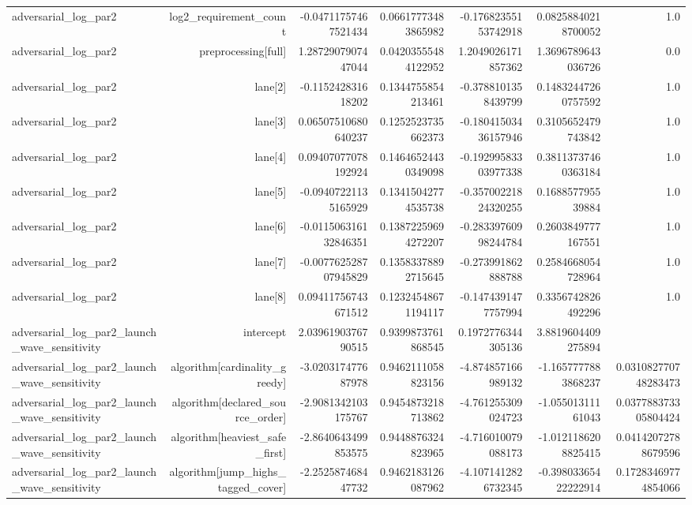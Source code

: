 {\begin{longtable}{lrrrrrr}
adversarial\_log\_par2 & log2\_requirement\_count & -0.04711757467521434 & 0.06617773483865982 & -0.17682355153742918 & 0.08258840218700052 & 1.0 \\
adversarial\_log\_par2 & preprocessing[full] & 1.2872907907447044 & 0.04203555484122952 & 1.2049026171857362 & 1.3696789643036726 & 0.0 \\
adversarial\_log\_par2 & lane[2] & -0.115242831618202 & 0.1344755854213461 & -0.3788101358439799 & 0.14832447260757592 & 1.0 \\
adversarial\_log\_par2 & lane[3] & 0.06507510680640237 & 0.1252523735662373 & -0.18041503436157946 & 0.3105652479743842 & 1.0 \\
adversarial\_log\_par2 & lane[4] & 0.09407077078192924 & 0.14646524430349098 & -0.19299583303977338 & 0.38113737460363184 & 1.0 \\
adversarial\_log\_par2 & lane[5] & -0.09407221135165929 & 0.13415042774535738 & -0.35700221824320255 & 0.168857795539884 & 1.0 \\
adversarial\_log\_par2 & lane[6] & -0.011506316132846351 & 0.13872259694272207 & -0.28339760998244784 & 0.2603849777167551 & 1.0 \\
adversarial\_log\_par2 & lane[7] & -0.007762528707945829 & 0.13583378892715645 & -0.273991862888788 & 0.2584668054728964 & 1.0 \\
adversarial\_log\_par2 & lane[8] & 0.09411756743671512 & 0.12324548671194117 & -0.1474391477757994 & 0.3356742826492296 & 1.0 \\
adversarial\_log\_par2\_launch\_wave\_sensitivity & intercept & 2.0396190376790515 & 0.9399873761868545 & 0.1972776344305136 & 3.8819604409275894 &  \\
adversarial\_log\_par2\_launch\_wave\_sensitivity & algorithm[cardinality\_greedy] & -3.020317477687978 & 0.9462111058823156 & -4.874857166989132 & -1.1657777883868237 & 0.031082770748283473 \\
adversarial\_log\_par2\_launch\_wave\_sensitivity & algorithm[declared\_source\_order] & -2.9081342103175767 & 0.9454873218713862 & -4.761255309024723 & -1.05501311161043 & 0.037788373305804424 \\
adversarial\_log\_par2\_launch\_wave\_sensitivity & algorithm[heaviest\_safe\_first] & -2.8640643499853575 & 0.9448876324823965 & -4.716010079088173 & -1.0121186208825415 & 0.04142072788679596 \\
adversarial\_log\_par2\_launch\_wave\_sensitivity & algorithm[jump\_highs\_tagged\_cover] & -2.252587468447732 & 0.9462183126087962 & -4.1071412826732345 & -0.39803365422222914 & 0.17283469774854066 \\

\end{longtable}}
